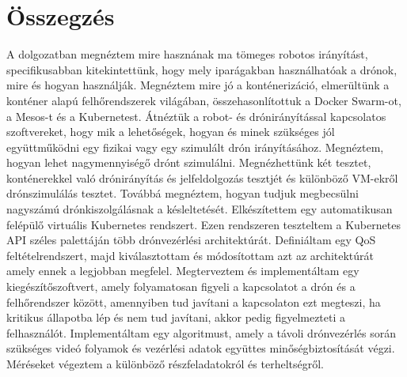 \chapter*{Összegzés}
A dolgozatban megnéztem mire hasznának ma tömeges robotos irányítást, specifikusabban kitekintettünk, hogy mely iparágakban használhatóak a drónok, mire és hogyan használják. Megnéztem mire jó a konténerizáció, elmerültünk a konténer alapú felhőrendszerek világában, összehasonlítottuk a Docker Swarm-ot, a Mesos-t és a Kubernetest. Átnéztük a robot- és drónirányítással kapcsolatos szoftvereket, hogy mik a lehetőségek, hogyan és minek szükséges jól együttműködni egy fizikai vagy egy szimulált drón irányításához. Megnéztem, hogyan lehet nagymennyiségő drónt szimulálni. Megnézhettünk két tesztet, konténerekkel való drónirányítás és jelfeldolgozás tesztjét és különböző VM-ekről drónszimulálás tesztet. Továbbá megnéztem, hogyan tudjuk megbecsülni nagyszámú drónkiszolgálásnak a késleltetését. Elkészítettem egy automatikusan felépülő virtuális Kubernetes rendszert. Ezen rendszeren teszteltem a Kubernetes API széles palettáján több drónvezérlési architektúrát. Definiáltam egy QoS feltételrendszert, majd kiválasztottam és módosítottam azt az architektúrát amely ennek a legjobban megfelel. Megterveztem és implementáltam egy kiegészítőszoftvert, amely folyamatosan figyeli a kapcsolatot a drón és a felhőrendszer között, amennyiben tud javítani a kapcsolaton ezt megteszi, ha kritikus állapotba lép és nem tud javítani, akkor pedig figyelmezteti a felhasználót. Implementáltam egy algoritmust, amely a távoli drónvezérlés során szükséges videó folyamok és vezérlési adatok együttes minőségbiztosítását végzi. Méréseket végeztem a különböző részfeladatokról és terheltségről.